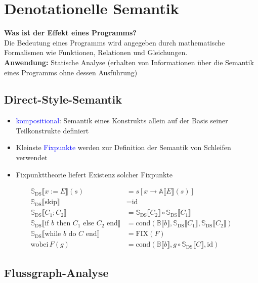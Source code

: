 \documentclass{scrreprt}
\theoremstyle{definition}
\theoremstyle{example}
\theoremstyle{algorithm}
\begin{document}
\section{Denotationelle Semantik}
\textbf{\textsf{Was ist der Effekt eines Programms?}}\\
Die Bedeutung eines Programms wird angegeben durch mathematische Formalismen wie Funktionen, Relationen und Gleichungen.\\
\textbf{Anwendung:} Statische Analyse (erhalten von Informationen über die Semantik eines Programms ohne dessen Ausführung)

\subsection{Direct-Style-Semantik}
\begin{itemize}
\item
\textcolor{blue}{kompositional}: Semantik eines Konstrukts allein auf der Basis seiner Teilkonstrukte definiert
\item
Kleinste \textcolor{blue}{Fixpunkte} werden zur Definition der Semantik von Schleifen verwendet
\item
Fixpunkttheorie liefert Existenz solcher Fixpunkte
\end{itemize}

\begin{framed}
\begin{align*}
\mathbb{S}_\text{DS}\llbracket x:=E \rrbracket (s)&= s[x\rightarrow\mathbb{A}\llbracket E\rrbracket(s)]\\
\mathbb{S}_\text{DS}\llbracket \text{skip} \rrbracket&= \text{id}\\
\mathbb{S}_\text{DS}\llbracket C_1;C_2 \rrbracket&= \mathbb{S}_\text{DS}\llbracket C_2 \rrbracket \circ \mathbb{S}_\text{DS}\llbracket C_1 \rrbracket\\
\mathbb{S}_\text{DS}\llbracket \text{if $b$ then $C_1$ else $C_2$ end} \rrbracket&= \text{cond}(\mathbb{B}\llbracket b\rrbracket,\mathbb{S}_\text{DS}\llbracket C_1 \rrbracket,\mathbb{S}_\text{DS}\llbracket C_2 \rrbracket)\\
\mathbb{S}_\text{DS}\llbracket \text{while $b$ do $C$ end} \rrbracket&= \text{FIX}(F)\\
\text{wobei}\,F(g)&=\text{cond}(\mathbb{B}\llbracket b\rrbracket,g \circ \mathbb{S}_\text{DS}\llbracket C \rrbracket,\text{id})
\end{align*}
\end{framed}

\subsection{Flussgraph-Analyse}
\end{document}
